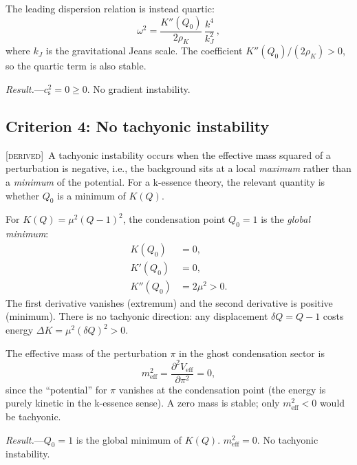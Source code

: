 \documentclass[prd,twocolumn,superscriptaddress,longbibliography,floatfix]{revtex4-2}
\newcommand{\cs}{c_{\mathrm{s}}}
\newcommand{\derived}{\textsc{[derived]}}
\begin{document}
The leading dispersion relation is instead quartic:
\begin{equation}
\omega^2 = \frac{K''(Q_0)}{2\rho_K}\,\frac{k^4}{k_J^2}\,,
\label{eq:k4}
\end{equation}
where $k_J$ is the gravitational Jeans scale.  The coefficient
$K''(Q_0)/(2\rho_K) > 0$, so the quartic term is also stable.

\textit{Result.}---$\cs^2 = 0 \geq 0$.  No gradient instability.
\checkmark


\subsection{Criterion 4: No tachyonic instability}
\label{sec:tachyon}

\derived\ A tachyonic instability occurs when the effective mass
squared of a perturbation is negative, i.e., the background sits
at a local \emph{maximum} rather than a \emph{minimum} of the
potential.  For a k-essence theory, the relevant quantity is
whether $Q_0$ is a minimum of $K(Q)$.

For $K(Q) = \mu^2(Q-1)^2$, the condensation point $Q_0 = 1$
is the \emph{global minimum}:
\begin{align}
K(Q_0) &= 0, \label{eq:K_min}\\
K'(Q_0) &= 0, \label{eq:Kp_min}\\
K''(Q_0) &= 2\mu^2 > 0. \label{eq:Kpp_min}
\end{align}
The first derivative vanishes (extremum) and the second derivative
is positive (minimum).  There is no tachyonic direction: any
displacement $\delta Q = Q - 1$ costs energy $\Delta K = \mu^2(\delta Q)^2 > 0$.

The effective mass of the perturbation $\pi$ in the ghost
condensation sector is
\begin{equation}
m_{\mathrm{eff}}^2 = \frac{\partial^2 V_{\mathrm{eff}}}{\partial\pi^2}
= 0,
\label{eq:meff}
\end{equation}
since the ``potential'' for $\pi$ vanishes at the condensation point
(the energy is purely kinetic in the k-essence sense).  A zero mass
is stable; only $m_{\mathrm{eff}}^2 < 0$ would be tachyonic.

\textit{Result.}---$Q_0 = 1$ is the global minimum of $K(Q)$.
$m_{\mathrm{eff}}^2 = 0$.  No tachyonic instability.  \checkmark


\end{document}
